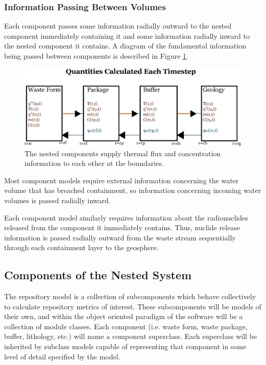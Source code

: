 \subsubsection{Information Passing Between Volumes}

Each component passes some information radially outward to the nested 
component immediately containing it and some information radially 
inward to the nested component it contains. A diagram of the fundamental
information being passed between components is described in Figure 
\ref{fig:flow}.

\begin{figure}[h!]
  \begin{center}
    \includegraphics[width=\textwidth]{./chapters/paradigm/flow.eps}
  \end{center}
  \caption{The nested components supply thermal flux and concentration 
  information to each other at the boundaries.}
  \label{fig:flow}
\end{figure}

Most component models require external information concerning the 
water volume that has breached containment, so information concerning 
incoming water volumes is passed radially inward. 

Each component model similarly requires information about the radionuclides 
released from the component it immediately contains.  Thus, nuclide 
release information is passed radially outward from the waste stream 
sequentially through each containment layer to the geosphere.


\subsection{Components of the Nested System}

The repository model is a collection of subcomponents which behave collectively 
to calculate repository metrics of interest. These subcomponents will be models 
of their own, and within the object oriented paradigm of the software will be 
a collection of module classes. Each component (i.e. waste form, waste 
package, buffer, lithology, etc.) will name a component superclass. Each superclass 
will be inherited by subclass models capable of representing that component in 
some level of detail specified by the model.

